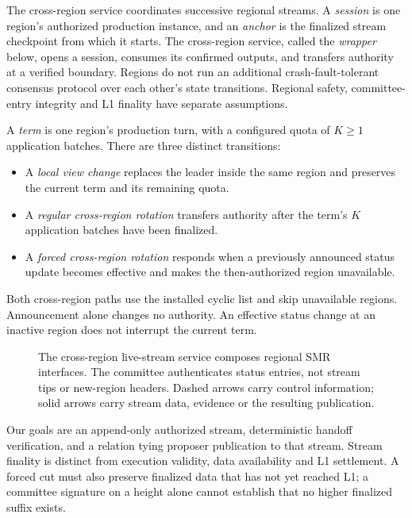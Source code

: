 \documentclass[11pt,a4paper,onecolumn]{article}
\newcounter{protocol}
\begin{document}
The cross-region service coordinates successive regional streams. A
\emph{session} is one region's authorized production instance, and an
\emph{anchor} is the finalized stream checkpoint from which it starts.
The cross-region service, called the \emph{wrapper} below, opens a session,
consumes its confirmed outputs, and transfers authority at a verified
boundary. Regions
do not run an additional crash-fault-tolerant consensus protocol over each
other's state transitions. Regional safety, committee-entry integrity and
L1 finality have separate assumptions.

A \emph{term} is one region's production turn, with a configured quota
of $K\geq1$ application batches. There are three distinct transitions:
\begin{itemize}
\item A \emph{local view change} replaces the leader inside the same region
and preserves the current term and its remaining quota.
\item A \emph{regular cross-region rotation} transfers authority after
the term's $K$ application batches have been finalized.
\item A \emph{forced cross-region rotation} responds when a previously
announced status update becomes effective and makes the then-authorized
region unavailable.
\end{itemize}
Both cross-region paths use the installed cyclic list and skip unavailable
regions. Announcement alone changes no authority. An effective status
change at an inactive region does not interrupt the current term.

\begin{figure}[htbp]\centering

\caption{The cross-region live-stream service composes regional SMR
interfaces. The committee authenticates status entries, not stream tips or
new-region headers. Dashed arrows carry control information; solid arrows
carry stream data, evidence or the resulting publication.}
\label{fig:architecture}
\end{figure}

Our goals are an append-only authorized stream, deterministic handoff
verification, and a relation tying proposer publication to that stream.
Stream finality is distinct from execution validity, data availability
and L1 settlement. A forced cut must also preserve finalized data that has
not yet reached L1; a committee signature on a height alone cannot establish
that no higher finalized suffix exists.
\end{document}
